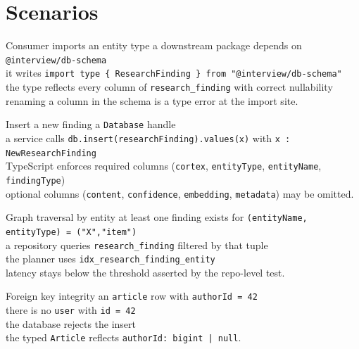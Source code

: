 \section{Scenarios}

\begin{scenario}{Consumer imports an entity type}
\Given a downstream package depends on \texttt{@interview/db-schema} \\
\When it writes \texttt{import type \{ ResearchFinding \} from "@interview/db-schema"} \\
\Then the type reflects every column of \texttt{research\_finding} with correct
nullability \\
\And renaming a column in the schema is a type error at the import site.
\end{scenario}

\begin{scenario}{Insert a new finding}
\Given a \texttt{Database} handle \\
\When a service calls \texttt{db.insert(researchFinding).values(x)} with
\texttt{x : NewResearchFinding} \\
\Then TypeScript enforces required columns (\texttt{cortex},
\texttt{entityType}, \texttt{entityName}, \texttt{findingType}) \\
\And optional columns (\texttt{content}, \texttt{confidence}, \texttt{embedding},
\texttt{metadata}) may be omitted.
\end{scenario}

\begin{scenario}{Graph traversal by entity}
\Given at least one finding exists for \texttt{(entityName, entityType) = ("X","item")} \\
\When a repository queries \texttt{research\_finding} filtered by that tuple \\
\Then the planner uses \texttt{idx\_research\_finding\_entity} \\
\And latency stays below the threshold asserted by the repo-level test.
\end{scenario}

\begin{scenario}{Foreign key integrity}
\Given an \texttt{article} row with \texttt{authorId = 42} \\
\When there is no \texttt{user} with \texttt{id = 42} \\
\Then the database rejects the insert \\
\And the typed \texttt{Article} reflects \texttt{authorId: bigint | null}.
\end{scenario}

